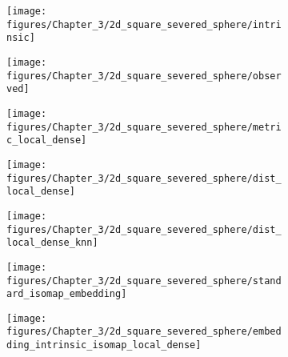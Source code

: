 \documentclass[final,supplement]{siamart1116}
\begin{document}
\begin{figure}[h]	
	\begin{centering}
		\begin{subfigure}[b]{0.32\linewidth}
			\texttt{[image: figures/Chapter\_3/2d\_square\_severed\_sphere/intrinsic]}
			\caption{\label{fig:punctured_severed_sphere_intrinsic1}}
		\end{subfigure}\hfill
		\begin{subfigure}[b]{0.30\linewidth}
			\texttt{[image: figures/Chapter\_3/2d\_square\_severed\_sphere/observed]}
			\caption{\label{fig:punctured_severed_sphere_observed1}}
		\end{subfigure}\hfill
		\begin{subfigure}[b]{0.30\linewidth}
			\texttt{[image: figures/Chapter\_3/2d\_square\_severed\_sphere/metric\_local\_dense]}
			\caption{\label{fig:punctured_severed_sphere_intrinsic_metric1}}
		\end{subfigure}
	\end{centering}
	\begin{centering}
		\begin{subfigure}[b]{0.45\linewidth}
			\texttt{[image: figures/Chapter\_3/2d\_square\_severed\_sphere/dist\_local\_dense]}
			\caption{\label{fig:punctured_severed_sphere_intrinsic_dist_est1}}
		\end{subfigure}
		\hfill
		\begin{subfigure}[b]{0.45\linewidth}
			\texttt{[image: figures/Chapter\_3/2d\_square\_severed\_sphere/dist\_local\_dense\_knn]}
			\caption{\label{fig:punctured_severed_sphere_intrinsic_dist_est_knn1}}
		\end{subfigure}
	\end{centering}
	\begin{centering}
		\begin{subfigure}[b]{0.32\linewidth}
			\texttt{[image: figures/Chapter\_3/2d\_square\_severed\_sphere/standard\_isomap\_embedding]}
			\caption{\label{fig:punctured_severed_sphere_standard_isomap_embedding1}}
		\end{subfigure} \hfill
		\begin{subfigure}[b]{0.32\linewidth}
			\texttt{[image: figures/Chapter\_3/2d\_square\_severed\_sphere/embedding\_intrinsic\_isomap\_local\_dense]}
			\caption{\label{fig:punctured_severed_sphere_intrinsic_isomap_embedding1}}
		\end{subfigure} \hfill
		\begin{subfigure}[b]{0.32\linewidth}

\end{subfigure}
\end{centering}
\end{figure}
\end{document}

